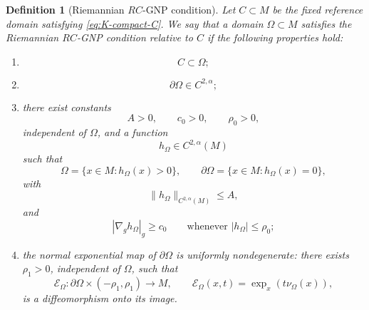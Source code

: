 \documentclass[10pt,a4paper]{amsart}
\newtheorem{definition}{Definition}
\begin{document}
\begin{definition}[Riemannian $RC$-GNP condition]
\label{def:RC-GNP}
Let $C\subset M$ be the fixed reference domain satisfying
\eqref{eq:K-compact-C}. We say that a domain $\Omega\subset M$
satisfies the \emph{Riemannian $RC$-GNP condition relative to $C$} if
the following properties hold:

\begin{enumerate}
\item
\begin{equation}
C\subset\Omega;
\label{eq:RCGNP-inclusion}
\end{equation}

\item
\[
\partial\Omega\in C^{2,\alpha};
\]

\item there exist constants
\[
A>0,
\qquad
c_0>0,
\qquad
\rho_0>0,
\]
independent of $\Omega$, and a function
\[
h_\Omega\in C^{2,\alpha}(M)
\]
such that
\begin{equation}
\Omega=\{x\in M:h_\Omega(x)>0\},
\qquad
\partial\Omega=\{x\in M:h_\Omega(x)=0\},
\label{eq:defining-function}
\end{equation}
with
\begin{equation}
\|h_\Omega\|_{C^{2,\alpha}(M)}
\leq A,
\label{eq:uniform-C2alpha}
\end{equation}
and
\begin{equation}
|\nabla_g h_\Omega|_g
\geq c_0
\qquad
\text{whenever }|h_\Omega|\leq\rho_0;
\label{eq:uniform-gradient}
\end{equation}

\item the normal exponential map of $\partial\Omega$ is uniformly
nondegenerate: there exists $\rho_1>0$, independent of $\Omega$, such
that
\begin{equation}
\mathcal E_\Omega:
\partial\Omega\times(-\rho_1,\rho_1)
\longrightarrow M,
\qquad
\mathcal E_\Omega(x,t)
=
\exp_x(t\nu_\Omega(x)),
\label{eq:normal-exp-Omega}
\end{equation}
is a diffeomorphism onto its image.
\end{enumerate}
\end{definition}
\end{document}
